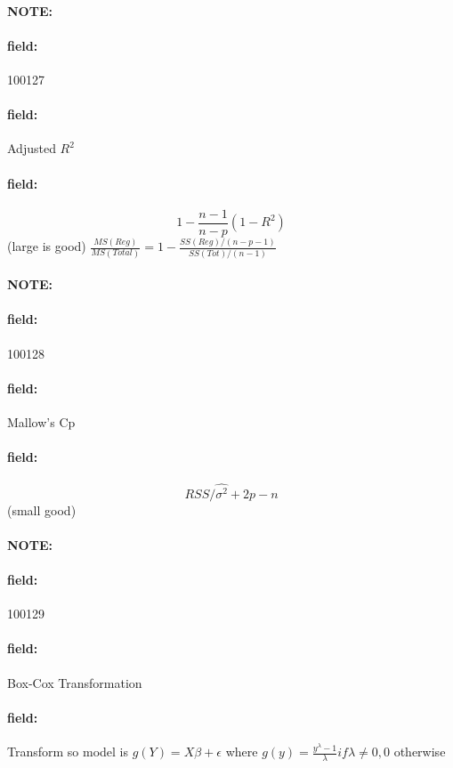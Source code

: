 \documentclass[12pt]{article}
\newenvironment{note}{\paragraph{NOTE:}}{}
\newenvironment{field}{\paragraph{field:}}{}
\begin{document}
\begin{note} \begin{field} \tiny 100127 \end{field}
  \begin{field}
    Adjusted $R^2$
  \end{field}
  \begin{field}
    $$ 1 - \frac{n-1}{n-p}(1 - R^2)$$ (large is good)
    $\frac{MS(Reg)}{MS(Total)} = 1 - \frac{SS(Reg)/(n - p - 1)}{SS(Tot)/(n-1)}$
  \end{field}
\end{note}

\begin{note} \begin{field} \tiny 100128 \end{field}
  \begin{field}
    Mallow's Cp
  \end{field}
  \begin{field}
    $$ RSS/\hat{\sigma^2} + 2p - n $$ (small good)
  \end{field}
\end{note}

\begin{note} \begin{field} \tiny 100129 \end{field}
  \begin{field}
    Box-Cox Transformation
  \end{field}
  \begin{field}
    Transform so model is $g(Y) = X\beta + \epsilon$
    where $g(y) = \frac{y^\lambda -1}{\lambda} if \lambda \neq 0, 0 $ otherwise
  \end{field}
\end{note}


\end{document}
